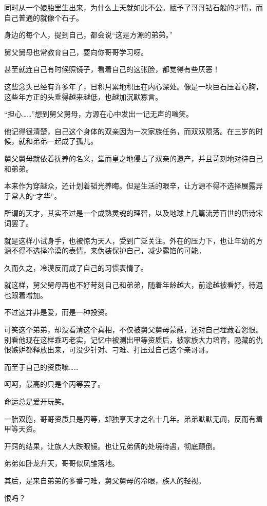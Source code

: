 \begin{this_body}
同时从一个娘胎里生出来，为什么上天就如此不公。赋予了哥哥钻石般的才情，而自己普通的就像个石子。

身边的每个人，提到自己，都会说“这是方源的弟弟。”

舅父舅母也常教育自己，要向你哥哥学习呀。

甚至就连自己有时候照镜子，看着自己的这张脸，都觉得有些厌恶！

这些念头已经有许多年了，日积月累地积压在内心深处。像是一块巨石压着心胸，这些年方正的头垂得越来越低，也越加沉默寡言。

“担心……”想到舅父舅母，方源在心中发出一记无声的嗤笑。

他记得很清楚，自己这个身体的双亲因为一次家族任务，而双双陨落。在三岁的时候，就和弟弟一起成了孤儿。

舅父舅母就依着抚养的名义，堂而皇之地侵占了双亲的遗产，并且苛刻地对待自己和弟弟。

本来作为穿越众，还计划着韬光养晦。但是生活的艰辛，让方源不得不选择展露异于常人的“才华”。

所谓的天才，其实不过是一个成熟灵魂的理智，以及地球上几篇流芳百世的唐诗宋词罢了。

就是这样小试身手，也被惊为天人，受到广泛关注。外在的压力下，也让年幼的方源不得不选择冷漠的表情，来伪装保护自己，减少露馅的可能。

久而久之，冷漠反而成了自己的习惯表情了。

就这样，舅父舅母再也不好苛刻自己和弟弟，随着年龄越大，前途越被看好，待遇也跟着增加。

不过这并非是爱，而是一种投资。

可笑这个弟弟，却没看清这个真相，不仅被舅父舅母蒙蔽，还对自己埋藏着怨恨。别看他现在这样乖巧老实，记忆中被测出甲等资质后，被家族大力培育，隐藏的仇恨嫉妒都释放出来，可没少针对、刁难、打压过自己这个亲哥哥。

而至于自己的资质嘛……

呵呵，最高的只是个丙等罢了。

命运总是爱开玩笑。

一胎双胞，哥哥资质只是丙等，却独享天才之名十几年。弟弟默默无闻，反而有着甲等天资。

开窍的结果，让族人大跌眼镜。也让兄弟俩的处境待遇，彻底颠倒。

弟弟如卧龙升天，哥哥似凤雏落地。

其后，是来自弟弟的多番刁难，舅父舅母的冷眼，族人的轻视。

恨吗？


\end{this_body}
